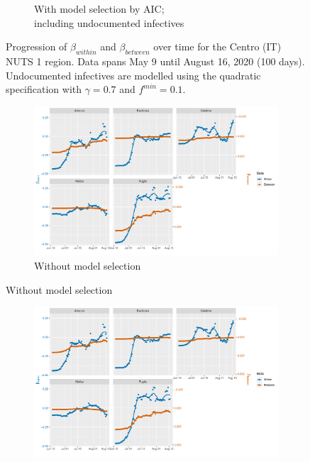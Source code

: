\documentclass[12pt]{article}
\begin{document}
\begin{appendices}
\begin{figure}[H]
\begin{subfigure}{\textwidth}
    	      \caption{With model selection by AIC; \\ including undocumented infectives}
    	      \label{fig:beta_between_over_time_centro_aic_undoc}
    	    \end{subfigure}
    	    \caption{Progression of $\beta_{within}$ and $\beta_{between}$ over time for the Centro (IT) NUTS 1 region. Data spans May 9 until August 16, 2020 (100 days). Undocumented infectives are modelled using the quadratic specification with $\gamma = 0.7$ and $f^{min}=0.1$.}
    	    \label{fig:beta_between_over_time_centro}
        \end{figure}
		
		\begin{figure}[H]
    	    \centering
    	    \begin{subfigure}{\textwidth}
    	      \centering
    	      \includegraphics[width=\linewidth]{output/model_between_lag14_betas_Sud_rolling.pdf}
    	      \caption{Without model selection}
    	      \label{fig:beta_between_over_time_sud_regular}
    	    \end{subfigure}
        \end{figure}
        \begin{figure}[H]\ContinuedFloat
    	    \begin{subfigure}{\textwidth}
    	      \centering
    	      \includegraphics[width=\linewidth]{output/model_between_lag14_betas_Sud_aic_rolling.pdf}

\end{subfigure}
\end{figure}
\end{appendices}
\end{document}
